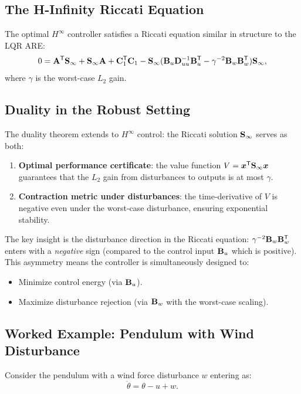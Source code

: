 \subsection{The H-Infinity Riccati Equation}

The optimal $H^\infty$ controller satisfies a Riccati equation similar in structure to the LQR ARE:
\begin{equation}
0 = \mathbf{A}^{\mathsf{T}}\mathbf{S}_\infty + \mathbf{S}_\infty\mathbf{A} + \mathbf{C}_1^{\mathsf{T}}\mathbf{C}_1
  - \mathbf{S}_\infty(\mathbf{B}_u\mathbf{D}_{uu}^{-1}\mathbf{B}_u^{\mathsf{T}} - \gamma^{-2}\mathbf{B}_w\mathbf{B}_w^{\mathsf{T}})\mathbf{S}_\infty,
\label{eq:ch6:hinf-are}
\end{equation}
where $\gamma$ is the worst-case $L_2$ gain.

\subsection{Duality in the Robust Setting}

The duality theorem extends to $H^\infty$ control: the Riccati solution $\mathbf{S}_\infty$ serves as both:
\begin{enumerate}
\item \textbf{Optimal performance certificate}: the value function $V = \bm{x}^{\mathsf{T}}\mathbf{S}_\infty\bm{x}$ guarantees that the
      $L_2$ gain from disturbances to outputs is at most $\gamma$.
\item \textbf{Contraction metric under disturbances}: the time-derivative of $V$ is negative even under the worst-case
      disturbance, ensuring exponential stability.
\end{enumerate}

The key insight is the disturbance direction in the Riccati equation: $\gamma^{-2}\mathbf{B}_w\mathbf{B}_w^{\mathsf{T}}$ enters with a
\textit{negative} sign (compared to the control input $\mathbf{B}_u$ which is positive). This asymmetry means the controller
is simultaneously designed to:
\begin{itemize}
\item Minimize control energy (via $\mathbf{B}_u$).
\item Maximize disturbance rejection (via $\mathbf{B}_w$ with the worst-case scaling).
\end{itemize}

\subsection{Worked Example: Pendulum with Wind Disturbance}

Consider the pendulum with a wind force disturbance $w$ entering as:
\begin{equation}
\ddot\theta = \theta - u + w.
\label{eq:ch6:pendulum-wind}
\end{equation}

